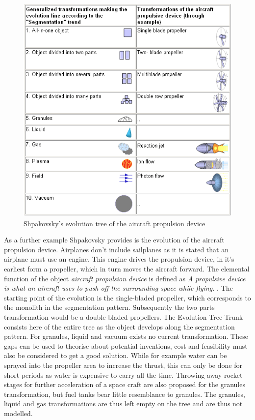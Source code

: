 \documentclass[11pt,a4paper]{article}
\begin{document}
\begin{figure}[htb]
	\centering
	\includegraphics[width=0.75\linewidth]{figures/aircraft.png}
	\caption{\small Shpakovsky's evolution tree of the aircraft propulsion device \cite{Shpakovsky2003}}
	\label{fig:aircraft}
\end{figure}

As a further example Shpakovsky provides is the evolution of the aircraft propulsion device. Airplanes don't include sailplanes as it is stated that an airplane must use an engine. This engine drives the propulsion device, in it's earliest form a propeller, which in turn moves the aircraft forward. The elemental function of the object \textit{aircraft propulsion device} is defined as \textit{A propulsive device is what an aircraft uses to push off the surrounding space while flying.} \cite{Shpakovsky2003}.
The starting point of the evolution is the single-bladed propeller, which corresponds to the monolith in the segmentation pattern. Subsequently the two parts transformation would be a double bladed propellers. The Evolution Tree Trunk consists here of the entire tree as the object develops along the segmentation pattern.
For granules, liquid and vacuum exists no current transformation. These gaps can be used to theorise about potential inventions, cost and feasibility must also be considered to get a good solution. While for example water can be sprayed into the propeller area to increase the thrust, this can only be done for short periods as water is expensive to carry all the time. Throwing away rocket stages for further acceleration of a space craft are also proposed for the granules transformation, but fuel tanks bear little resemblance to granules. The granules, liquid and gas transformations are thus left empty on the tree and are thus not modelled.
\end{document}
